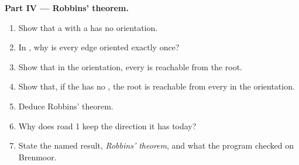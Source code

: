 \begin{problem}
\medskip\noindent\textbf{Part IV --- Robbins' theorem.}
\begin{enumerate}[resume]
\item Show that a  with a  has no  orientation.
\item In , why is every edge oriented exactly once?
\item Show that in the orientation, every  is reachable from the root.
\item Show that, if the  has no , the root is reachable from every  in the orientation.
\item Deduce Robbins' theorem.
\item Why does road 1 keep the direction it has today?
\item State the named result, \emph{Robbins' theorem}, and what the program checked on Brenmoor.
\end{enumerate}
\end{problem}

